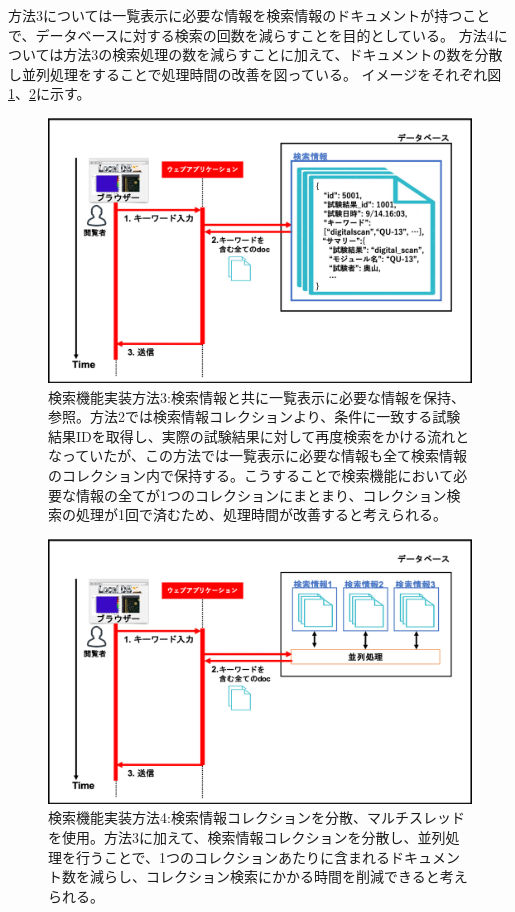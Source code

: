 方法3については一覧表示に必要な情報を検索情報のドキュメントが持つことで、データベースに対する検索の回数を減らすことを目的としている。
方法4については方法3の検索処理の数を減らすことに加えて、ドキュメントの数を分散し並列処理をすることで処理時間の改善を図っている。
イメージをそれぞれ図\ref{search_summary_hash}、\ref{search_multi_thread}に示す。

\begin{figure}[bpt]
  \begin{center}
    \includegraphics[width=12cm]{search_summary_hash}
  \caption[検索機能実装方法3:検索情報と共に一覧表示に必要な情報を保持、参照]{検索機能実装方法3:検索情報と共に一覧表示に必要な情報を保持、参照。方法2では検索情報コレクションより、条件に一致する試験結果IDを取得し、実際の試験結果に対して再度検索をかける流れとなっていたが、この方法では一覧表示に必要な情報も全て検索情報のコレクション内で保持する。こうすることで検索機能において必要な情報の全てが1つのコレクションにまとまり、コレクション検索の処理が1回で済むため、処理時間が改善すると考えられる。}
  \label{search_summary_hash}
  \end{center}
\end{figure}

\begin{figure}[bpt]
  \begin{center}
    \includegraphics[width=12cm]{search_multi_thread}
  \caption[検索機能実装方法4:検索情報コレクションを分散、マルチスレッドを使用]{検索機能実装方法4:検索情報コレクションを分散、マルチスレッドを使用。方法3に加えて、検索情報コレクションを分散し、並列処理を行うことで、1つのコレクションあたりに含まれるドキュメント数を減らし、コレクション検索にかかる時間を削減できると考えられる。}
  \label{search_multi_thread}
  \end{center}
\end{figure}

